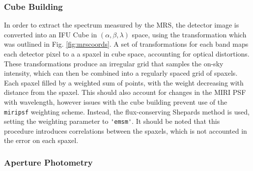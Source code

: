 \subsubsection{Cube Building}
In order to extract the spectrum measured by the MRS, the detector image is converted into an IFU Cube in $(\alpha,\beta,\lambda)$ space, using the transformation which was outlined in Fig. \ref{fig:mrscoords}.
A set of transformations for each band maps each detector pixel to a a spaxel in cube space, accounting for  optical distortions. 
These transformations produce an irregular grid that samples the on-sky intensity, which can then be combined into a regularly spaced grid of spaxels.
Each spaxel filled by a weighted sum of points, with the weight decreasing with distance from the spaxel. 
This should also account for changes in the MIRI PSF with wavelength, however issues with the cube building prevent use of the \verb|miripsf| weighting scheme.
Instead, the flux-conserving Shepards method is used, setting the weighting parameter to \verb|'emsm'|.
It should be noted that this procedure introduces correlations between the spaxels, which is not accounted in the error on each spaxel.

\subsubsection{Aperture Photometry}

